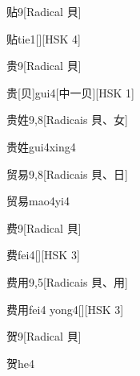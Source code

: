 \begin{entry}{贴}{9}[Radical ⾙]
  \begin{phonetics}{贴}{tie1}[][HSK 4]
  \end{phonetics}
\end{entry}

\begin{entry}{贵}{9}[Radical ⾙]
  \begin{phonetics}{贵}[⻉]{gui4}[中一⻉][HSK 1]
  \end{phonetics}
\end{entry}

\begin{entry}{贵姓}{9,8}[Radicais ⾙、⼥]
  \begin{phonetics}{贵姓}{gui4xing4}
  \end{phonetics}
\end{entry}

\begin{entry}{贸易}{9,8}[Radicais ⾙、⽇]
  \begin{phonetics}{贸易}{mao4yi4}
  \end{phonetics}
\end{entry}

\begin{entry}{费}{9}[Radical ⾙]
  \begin{phonetics}{费}{fei4}[][HSK 3]
  \end{phonetics}
\end{entry}

\begin{entry}{费用}{9,5}[Radicais ⾙、⽤]
  \begin{phonetics}{费用}{fei4 yong4}[][HSK 3]
  \end{phonetics}
\end{entry}

\begin{entry}{贺}{9}[Radical ⾙]
  \begin{phonetics}{贺}{he4}
  \end{phonetics}
\end{entry}

